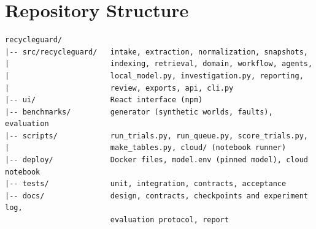 \clearpage
\section{Repository Structure}
\begin{lstlisting}[language={},numbers=none,caption={Repository layout (abridged)}]
recycleguard/
|-- src/recycleguard/   intake, extraction, normalization, snapshots,
|                       indexing, retrieval, domain, workflow, agents,
|                       local_model.py, investigation.py, reporting,
|                       review, exports, api, cli.py
|-- ui/                 React interface (npm)
|-- benchmarks/         generator (synthetic worlds, faults), evaluation
|-- scripts/            run_trials.py, run_queue.py, score_trials.py,
|                       make_tables.py, cloud/ (notebook runner)
|-- deploy/             Docker files, model.env (pinned model), cloud notebook
|-- tests/              unit, integration, contracts, acceptance
|-- docs/               design, contracts, checkpoints and experiment log,
                        evaluation protocol, report
\end{lstlisting}
